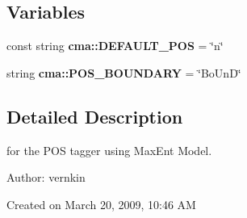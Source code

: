 \subsection*{Variables}
\begin{CompactItemize}
\item 
const string \textbf{cma::DEFAULT\_\-POS} = \char`\"{}n\char`\"{}\label{namespacecma_04d12652e76d2d5baa4c07f09fa9b639}

\item 
string \textbf{cma::POS\_\-BOUNDARY} = \char`\"{}BoUnD\char`\"{}\label{namespacecma_6d33cf1fe0a06dac555f3a85fec6c4a6}

\end{CompactItemize}


\subsection{Detailed Description}
for the POS tagger using MaxEnt Model. 

\begin{Desc}
\item[Author:]vernkin\end{Desc}
Created on March 20, 2009, 10:46 AM 